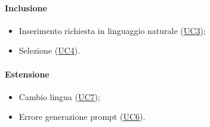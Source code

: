 \paragraph*{Inclusione}
\begin{itemize}
  \item Inserimento richiesta in linguaggio naturale (\hyperref[UC3]{UC3});
  \item Selezione  (\hyperref[UC4]{UC4}).
\end{itemize}

\paragraph*{Estensione}
\begin{itemize}
  \item Cambio lingua (\hyperref[UC7]{UC7});
  \item Errore generazione prompt (\hyperref[UC6]{UC6}).
\end{itemize}
